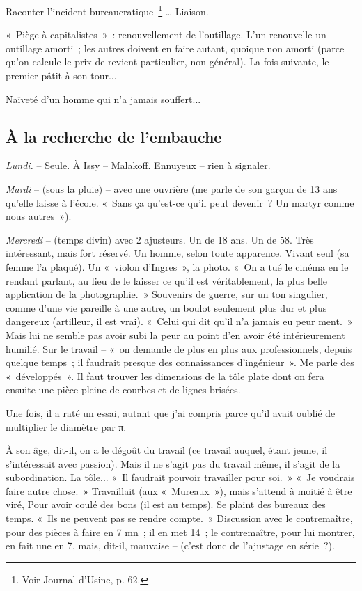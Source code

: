\documentclass[french,twoside]{book} %
\begin{document}
\noindent Raconter l'incident bureaucratique \footnote{Voir Journal d'Usine, p. 62.} … Liaison.\par
« Piège à capitalistes » : renouvellement de l'outillage. L'un renouvelle un outillage amorti ; les autres doivent en faire autant, quoique non amorti (parce qu'on calcule le prix de revient particulier, non général). La fois suivante, le premier pâtit à son tour...\par
Naïveté d'un homme qui n'a jamais souffert...
\subsection[À la recherche de l’embauche]{À la recherche de l’embauche}
\noindent \par
{\itshape Lundi.} – Seule. À Issy – Malakoff. Ennuyeux – rien à signaler.\par
{\itshape Mardi} – (sous la pluie) – avec une ouvrière (me parle de son garçon de 13 ans qu'elle laisse à l'école. « Sans ça qu'est-ce qu'il peut devenir ? Un martyr comme nous autres »).\par
{\itshape Mercredi} – (temps divin) avec 2 ajusteurs. Un de 18 ans. Un de 58. Très intéressant, mais fort réservé. Un homme, selon toute apparence. Vivant seul (sa femme l'a plaqué). Un « violon d'Ingres », la photo. « On a tué le cinéma en le rendant parlant, au lieu de le laisser ce qu'il est véritablement, la plus belle application de la photographie. » Souvenirs de guerre, sur un ton singulier, comme d'une vie pareille à une autre, un boulot seulement plus dur et plus dangereux (artilleur, il est vrai). « Celui qui dit qu'il n'a jamais eu peur ment. » Mais lui ne semble pas avoir subi la peur au point d'en avoir été intérieurement humilié. Sur le travail – « on demande de plus en plus aux professionnels, depuis quelque temps ; il faudrait presque des connaissances d'ingénieur ». Me parle des « développés ». Il faut trouver les dimensions de la tôle plate dont on fera ensuite une pièce pleine de courbes et de lignes brisées.\par
[{\itshape Tâcher de savoir de la manière la plus précise ce que c'est qu'un développé}.]\par
Une fois, il a raté un essai, autant que j'ai compris parce qu'il avait oublié de multiplier le diamètre par π.\par
À son âge, dit-il, on a le dégoût du travail (ce travail auquel, étant jeune, il s'intéressait avec passion). Mais il ne s’agit pas du travail même, il s'agit de la subordination. La tôle... « Il faudrait pouvoir travailler pour soi. » « Je voudrais faire autre chose. » Travaillait (aux « Mureaux »), mais s'attend à moitié à être viré, Pour avoir coulé des bons (il est au temps). Se plaint des bureaux des temps. « Ils ne peuvent pas se rendre compte. » Discussion avec le contremaître, pour des pièces à faire en 7 mn ; il en met 14 ; le contremaître, pour lui montrer, en fait une en 7, mais, dit-il, mauvaise – (c'est donc de l'ajustage en série ?).\par
\end{document}
